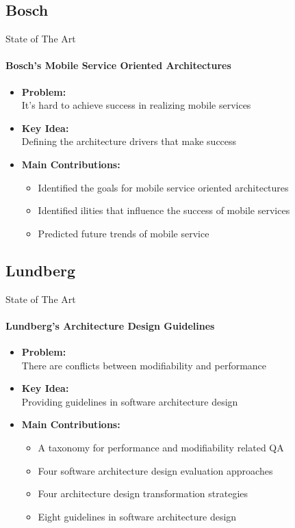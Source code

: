 \documentclass[xcolor=x11names,compress]{beamer}
\renewcommand{\(}{\begin{columns}}
\renewcommand{\)}{\end{columns}}
\newcommand{\<}[1]{\begin{column}{#1}}
\renewcommand{\>}{\end{column}}
\begin{document}
\subsection{Bosch}
\begin{frame}{State of The Art}
\framesubtitle{Bosch's Mobile Service Oriented Architectures \cite{vanGurp:MOSOA}}
\begin{itemize}
\item \textbf{Problem:}\\It's hard to achieve success in realizing mobile services
\item \textbf{Key Idea:} \\Defining the architecture drivers that make success
\item \textbf{Main Contributions:}
\begin{itemize}
	\item Identified the goals for mobile service oriented architectures
	\item Identified ilities that influence the success of mobile services
	\item Predicted future trends of mobile service
\end{itemize}
\end{itemize}

\end{frame}



\subsection{Lundberg}
\begin{frame}{State of The Art}
\framesubtitle{Lundberg's Architecture Design Guidelines \cite{Lundberg:qualityattributes}}
\begin{itemize}
\item \textbf{Problem:}\\There are conflicts between modifiability and performance
\item \textbf{Key Idea:} \\Providing guidelines in software architecture design
\item \textbf{Main Contributions:}
\begin{itemize}
	\item A taxonomy for performance and modifiability related QA
	\item Four software architecture design evaluation approaches
	\item Four architecture design transformation strategies
	\item Eight guidelines in software architecture design

\end{itemize}
\end{itemize}

\end{frame}
\end{document}
